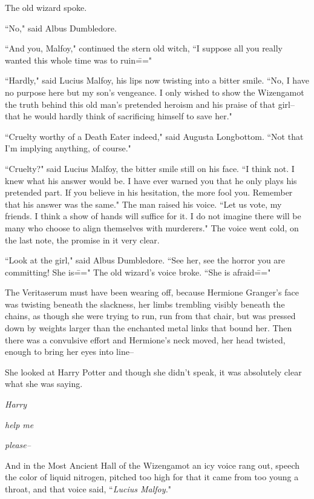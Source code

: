 The old wizard spoke.

``No," said Albus Dumbledore.

``And you, Malfoy," continued the stern old witch, ``I suppose all you really wanted this whole time was to ruin\==="

``Hardly," said Lucius Malfoy, his lips now twisting into a bitter smile. ``No, I have no purpose here but my son's vengeance. I only wished to show the Wizengamot the truth behind this old man's pretended heroism and his praise of that girl\---that he would hardly think of sacrificing himself to save her."

``Cruelty worthy of a Death Eater indeed," said Augusta Longbottom. ``Not that I'm implying anything, of course."

``Cruelty?" said Lucius Malfoy, the bitter smile still on his face. ``I think not. I knew what his answer would be. I have ever warned you that he only plays his pretended part. If you believe in his hesitation, the more fool you. Remember that his answer was the same." The man raised his voice. ``Let us vote, my friends. I think a show of hands will suffice for it. I do not imagine there will be many who choose to align themselves with murderers." The voice went cold, on the last note, the promise in it very clear.

``Look at the girl," said Albus Dumbledore. ``See her, see the horror you are committing! She is\===" The old wizard's voice broke. ``She is afraid\==="

The Veritaserum must have been wearing off, because Hermione Granger's face was twisting beneath the slackness, her limbs trembling visibly beneath the chains, as though she were trying to run, run from that chair, but was pressed down by weights larger than the enchanted metal links that bound her. Then there was a convulsive effort and Hermione's neck moved, her head twisted, enough to bring her eyes into line\---

She looked at Harry Potter and though she didn't speak, it was absolutely clear what she was saying.

\emph{Harry}

\emph{help me}

\emph{please\---}

And in the Most Ancient Hall of the Wizengamot an icy voice rang out, speech the color of liquid nitrogen, pitched too high for that it came from too young a throat, and that voice said, ``\emph{Lucius Malfoy.}"

\later

